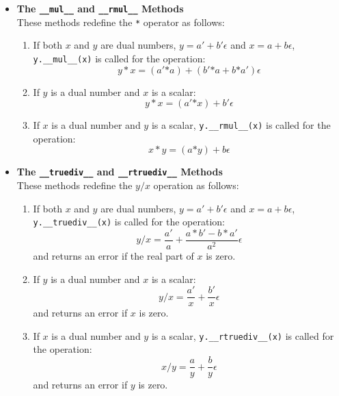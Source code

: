 \documentclass[a4paper,12pt]{article}
\begin{document}
\begin{itemize}
    \item \textbf{The \texttt{\_\_mul\_\_} and \texttt{\_\_rmul\_\_} Methods} \\
    These methods redefine the \texttt{*} operator as follows:
    \begin{enumerate}
        \item If both \(x\) and \(y\) are dual numbers, \(y = a' + b'\epsilon\) and \(x = a + b\epsilon\), \texttt{y.\_\_mul\_\_(x)} is called for the operation:
        \[
        y * x = (a' \texttt{*} a) + (b' \texttt{*} a + b \texttt{*} a')\epsilon
        \]
        \item If \(y\) is a dual number and \(x\) is a scalar:
        \[
        y * x = (a' \texttt{*} x) + b'\epsilon
        \]
        \item If \(x\) is a dual number and \(y\) is a scalar, \texttt{y.\_\_rmul\_\_(x)} is called for the operation:
        \[
        x * y = (a \texttt{*} y) + b\epsilon
        \]
    \end{enumerate}

    \item \textbf{The \texttt{\_\_truediv\_\_} and \texttt{\_\_rtruediv\_\_} Methods} \\
    These methods redefine the \(y / x\) operation as follows:
    \begin{enumerate}
        \item If both \(x\) and \(y\) are dual numbers, \(y = a' + b'\epsilon\) and \(x = a + b\epsilon\), \texttt{y.\_\_truediv\_\_(x)} is called for the operation:
        \[
        y / x = \frac{a'}{a} + \frac{a*b' - b*a'}{a^2}\epsilon
        \]
        and returns an error if the real part of \(x\) is zero.
        \item If \(y\) is a dual number and \(x\) is a scalar:
        \[
        y / x = \frac{a'}{x} + \frac{b'}{x}\epsilon
        \]
        and returns an error if \(x\) is zero.
        \item If \(x\) is a dual number and \(y\) is a scalar, \texttt{y.\_\_rtruediv\_\_(x)} is called for the operation:
        \[
        x / y = \frac{a}{y} + \frac{b}{y}\epsilon
        \]
        and returns an error if \(y\) is zero.
    \end{enumerate}


\end{itemize}
\end{document}

